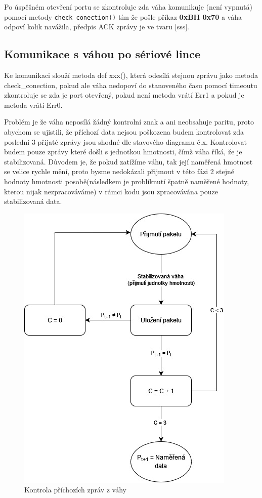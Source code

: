 
Po úspěšném otevření portu se zkontroluje zda váha komunikuje (není vypnutá) pomocí metody \texttt{check\_conection()} tím že pošle příkaz \textbf{0xBH 0x70} a váha odpoví kolik navážila, předpis ACK zprávy je ve tvaru [sss].


\subsection{Komunikace s váhou po sériové lince}

Ke komunikaci slouží metoda def xxx(), která odesílá stejnou zprávu jako metoda check\_conection, pokud ale váha nedopoví do stanoveného času pomocí timeoutu zkontroluje se zda je port otevřený, pokud není metoda vrátí Err1 a pokud je metoda vrátí Err0.

Problém je že váha neposílá žádný kontrolní znak a ani neobsahuje paritu, proto abychom se ujistili, že příchozí data nejsou poškozena budem kontrolovat zda poslední 3 přijaté zprávy jsou shodné dle stavového diagramu č.x. Kontrolovat budem pouze zprávy které došli s jednotkou hmotnosti, čímž váha říká, že je stabilizovaná. Důvodem je, že pokud zatížíme váhu, tak její naměřená hmotnost se velice rychle mění, proto bysme nedokázali přijmout v této fázi 2 stejné hodnoty hmotnosti posobě(následkem je probliknutí špatně naměřené hodnoty, kterou nijak nezpracováváme) v rámci kodu jsou zpracovávána pouze stabilizovaná data.


\begin{figure}[H]
    \begin{center}
        \includegraphics[scale=0.6]{obrazky/stavovy_automat_parita.jpg}
    \end{center}
    \caption{Kontrola příchozích zpráv z váhy}
    \label{ošetření parity}
\end{figure}


